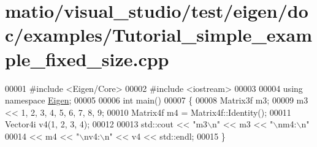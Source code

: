 \hypertarget{matio_2visual__studio_2test_2eigen_2doc_2examples_2_tutorial__simple__example__fixed__size_8cpp_source}{}\section{matio/visual\+\_\+studio/test/eigen/doc/examples/\+Tutorial\+\_\+simple\+\_\+example\+\_\+fixed\+\_\+size.cpp}
\label{matio_2visual__studio_2test_2eigen_2doc_2examples_2_tutorial__simple__example__fixed__size_8cpp_source}

\begin{DoxyCode}
00001 \textcolor{preprocessor}{#include <Eigen/Core>}
00002 \textcolor{preprocessor}{#include <iostream>}
00003 
00004 \textcolor{keyword}{using namespace }\hyperlink{namespace_eigen}{Eigen};
00005 
00006 \textcolor{keywordtype}{int} main()
00007 \{
00008   Matrix3f m3;
00009   m3 << 1, 2, 3, 4, 5, 6, 7, 8, 9;
00010   Matrix4f m4 = Matrix4f::Identity();
00011   Vector4i v4(1, 2, 3, 4);
00012 
00013   std::cout << \textcolor{stringliteral}{"m3\(\backslash\)n"} << m3 << \textcolor{stringliteral}{"\(\backslash\)nm4:\(\backslash\)n"}
00014     << m4 << \textcolor{stringliteral}{"\(\backslash\)nv4:\(\backslash\)n"} << v4 << std::endl;
00015 \}
\end{DoxyCode}
